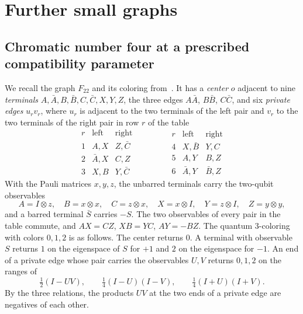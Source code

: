 \section{Further small graphs}\label{sec:small}

\subsection{Chromatic number four at a prescribed compatibility parameter}\label{sec:stretch}

We recall the graph $F_{22}$ and its coloring from~\cite[Proposition~6.1]{Z}. It has a \emph{center} $o$ adjacent to nine \emph{terminals} $A,\bar A,B,\bar B,C,\bar C,X,Y,Z$, the three edges $A\bar A$, $B\bar B$, $C\bar C$, and six \emph{private edges} $u_rv_r$, where $u_r$ is adjacent to the two terminals of the left pair and $v_r$ to the two terminals of the right pair in row $r$ of the table
\[
\begin{array}{c|cc}
 r&\text{left}&\text{right}\\ \hline
 1&A,X&Z,\bar C\\
 2&\bar A,X&C,Z\\
 3&X,B&Y,\bar C
\end{array}
\qquad\qquad
\begin{array}{c|cc}
 r&\text{left}&\text{right}\\ \hline
 4&X,\bar B&Y,C\\
 5&A,Y&B,Z\\
 6&\bar A,Y&\bar B,Z
\end{array}
\]
With the Pauli matrices $x,y,z$, the unbarred terminals carry the two-qubit observables
\[
 A=I\otimes z,\quad B=x\otimes x,\quad C=z\otimes x,\quad X=x\otimes I,\quad Y=z\otimes I,\quad Z=y\otimes y,
\]
and a barred terminal $\bar S$ carries $-S$. The two observables of every pair in the table commute, and $AX=CZ$, $XB=YC$, $AY=-BZ$. The quantum $3$-coloring with colors $0,1,2$ is as follows. The center returns $0$. A terminal with observable $S$ returns $1$ on the eigenspace of $S$ for $+1$ and $2$ on the eigenspace for $-1$. An end of a private edge whose pair carries the observables $U,V$ returns $0,1,2$ on the ranges of
\begin{equation}\label{eq:private}
 \tfrac12(I-UV),\qquad\tfrac14(I-U)(I-V),\qquad\tfrac14(I+U)(I+V).
\end{equation}
By the three relations, the products $UV$ at the two ends of a private edge are negatives of each other.

